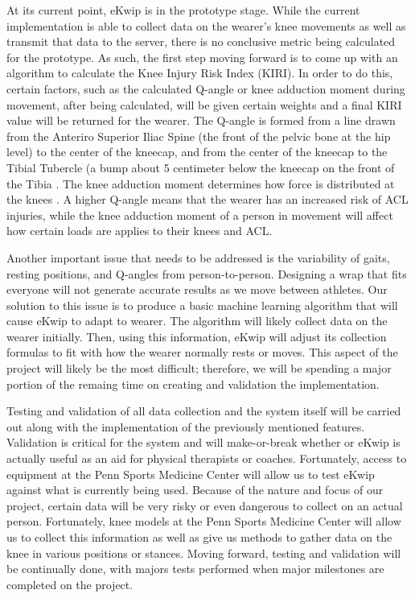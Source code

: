 At its current point, eKwip is in the prototype stage. While the current implementation is able to collect data on the wearer's knee movements as well as transmit that data to the server, there is no conclusive metric being calculated for the prototype. As such, the first step moving forward is to come up with an algorithm to calculate the Knee Injury Risk Index (KIRI). In order to do this, certain factors, such as the calculated Q-angle or knee adduction moment during movement, after being calculated, will be given certain weights and a final KIRI value will be returned for the wearer. The Q-angle is formed from a line drawn from the Anteriro Superior Iliac Spine (the front of the pelvic bone at the hip level) to the center of the kneecap, and from the center of the kneecap to the Tibial Tubercle (a bump about 5 centimeter below the kneecap on the front of the Tibia . The knee adduction moment determines how force is distributed at the knees . A higher Q-angle means that the wearer has an increased risk of ACL injuries, while the knee adduction moment of a person in movement will affect how certain loads are applies to their knees and ACL. 

Another important issue that needs to be addressed is the variability of gaits, resting positions, and Q-angles from person-to-person. Designing a wrap that fits everyone will not generate accurate results as we move between athletes. Our solution to this issue is to produce a basic machine learning algorithm that will cause eKwip to adapt to wearer. The algorithm will likely collect data on the wearer initially. Then, using this information, eKwip will adjust its collection formulas to fit with how the wearer normally rests or moves. This aspect of the project will likely be the most difficult; therefore, we will be spending a major portion of the remaing time on creating and validation the implementation.

Testing and validation of all data collection and the system itself will be carried out along with the implementation of the previously mentioned features. Validation is critical for the system and will make-or-break whether or eKwip is actually useful as an aid for physical therapists or coaches. Fortunately, access to equipment at the Penn Sports Medicine Center will allow us to test eKwip against what is currently being used. Because of the nature and focus of our project, certain data will be very risky or even dangerous to collect on an actual person. Fortunately, knee models at the Penn Sports Medicine Center will allow us to collect this information as well as give us methods to gather data on the knee in various positions or stances. Moving forward, testing and validation will be continually done, with majors tests performed when major milestones are completed on the project.

